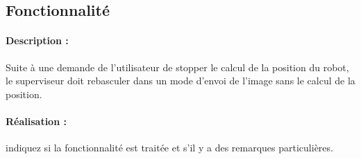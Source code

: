 \documentclass[11pt, a4paper]{paper}
\newcounter{cptreq}
\begin{document}
\subsection{Fonctionnalité \thecptreq}

\paragraph{Description :} Suite à une demande de l'utilisateur de stopper le calcul de la position du robot, le superviseur doit rebasculer dans un mode d'envoi de l'image sans le calcul de la position.

\paragraph{\color{black}Réalisation :}  {\color{red} indiquez si la fonctionnalité est traitée et s'il y a des remarques particulières.}
\end{document}
